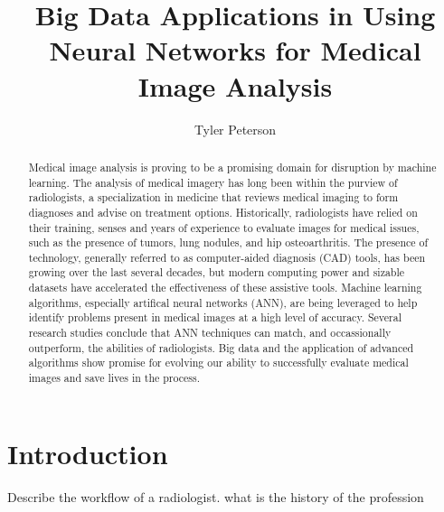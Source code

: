 \documentclass[sigconf]{acmart}
\begin{document}
\title{Big Data Applications in Using Neural Networks for Medical Image Analysis}


\author{Tyler Peterson}


\renewcommand{\shortauthors}{G. v. Laszewski}


\begin{abstract}

 Medical image analysis is proving to be a promising domain for disruption by machine learning. The analysis of medical imagery has long been within the purview of radiologists, a specialization in medicine that reviews medical imaging to form diagnoses and advise on treatment options. Historically, radiologists have relied on their training, senses and years of experience to evaluate images for medical issues, such as the presence of tumors, lung nodules, and hip osteoarthritis. The presence of technology, generally referred to as computer-aided diagnosis (CAD) tools, has been growing over the last several decades, but modern computing power and sizable datasets have accelerated the effectiveness of these assistive tools. Machine learning algorithms, especially artifical neural networks (ANN), are being leveraged to help identify problems present in medical images at a high level of accuracy. Several research studies conclude that ANN techniques can match, and occassionally outperform, the abilities of radiologists. Big data and the application of advanced algorithms show promise for evolving our ability to successfully evaluate medical images and save lives in the process.      
  
\end{abstract}




\maketitle


\section{Introduction}

Describe the workflow of a radiologist. what is the history of the profession
\end{document}
